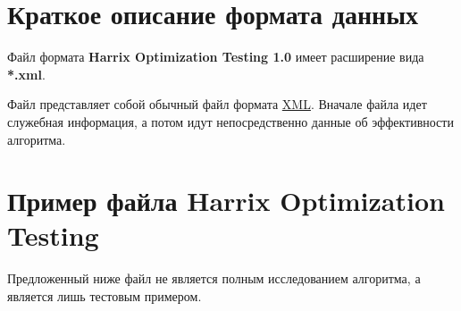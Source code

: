 \documentclass[a4paper,12pt]{article}
\begin{document}
\section{Краткое описание формата данных}

Файл формата \textbf{Harrix Optimization Testing 1.0} имеет расширение вида \textbf{*.xml}.

Файл представляет собой обычный файл формата \href {http://ru.wikipedia.org/wiki/XML} {XML}. Вначале файла идет служебная информация, а потом идут непосредственно данные об эффективности алгоритма.

\section{Пример файла Harrix Optimization Testing}

Предложенный ниже файл не является полным исследованием алгоритма, а является лишь тестовым примером.
\end{document}
